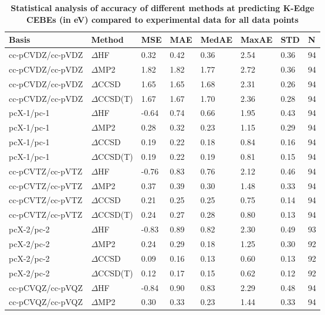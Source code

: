 \begin{table}
  \caption{\textbf{Statistical analysis of accuracy of different methods at predicting K-Edge CEBEs (in eV) compared to experimental data for all data points}}
  \begin{tabular}{l l l l l l l l }
    \toprule
    \textbf{Basis} & \textbf{Method} & \textbf{MSE} & \textbf{MAE} & \textbf{MedAE} & \textbf{MaxAE} & \textbf{STD} & \textbf{N} \\ 
    \midrule
    cc-pCVDZ/cc-pVDZ & $\Delta$HF & 0.32 & 0.42 & 0.36 & 2.54 & 0.36 & 94 \\ 
    cc-pCVDZ/cc-pVDZ & $\Delta$MP2 & 1.82 & 1.82 & 1.77 & 2.72 & 0.36 & 94 \\ 
    cc-pCVDZ/cc-pVDZ & $\Delta$CCSD & 1.65 & 1.65 & 1.68 & 2.31 & 0.26 & 94 \\ 
    cc-pCVDZ/cc-pVDZ & $\Delta$CCSD(T) & 1.67 & 1.67 & 1.70 & 2.36 & 0.28 & 94 \\ 
    pcX-1/pc-1 & $\Delta$HF & -0.64 & 0.74 & 0.66 & 1.95 & 0.43 & 94 \\ 
    pcX-1/pc-1 & $\Delta$MP2 & 0.28 & 0.32 & 0.23 & 1.15 & 0.29 & 94 \\ 
    pcX-1/pc-1 & $\Delta$CCSD & 0.19 & 0.22 & 0.18 & 0.84 & 0.16 & 94 \\ 
    pcX-1/pc-1 & $\Delta$CCSD(T) & 0.19 & 0.22 & 0.19 & 0.81 & 0.15 & 94 \\ 
    cc-pCVTZ/cc-pVTZ & $\Delta$HF & -0.76 & 0.83 & 0.76 & 2.12 & 0.46 & 94 \\ 
    cc-pCVTZ/cc-pVTZ & $\Delta$MP2 & 0.37 & 0.39 & 0.30 & 1.48 & 0.33 & 94 \\ 
    cc-pCVTZ/cc-pVTZ & $\Delta$CCSD & 0.21 & 0.25 & 0.25 & 0.75 & 0.14 & 94 \\ 
    cc-pCVTZ/cc-pVTZ & $\Delta$CCSD(T) & 0.24 & 0.27 & 0.28 & 0.80 & 0.13 & 94 \\ 
    pcX-2/pc-2 & $\Delta$HF & -0.83 & 0.89 & 0.82 & 2.30 & 0.49 & 93 \\ 
    pcX-2/pc-2 & $\Delta$MP2 & 0.24 & 0.29 & 0.18 & 1.25 & 0.30 & 92 \\ 
    pcX-2/pc-2 & $\Delta$CCSD & 0.09 & 0.16 & 0.13 & 0.60 & 0.13 & 92 \\ 
    pcX-2/pc-2 & $\Delta$CCSD(T) & 0.12 & 0.17 & 0.15 & 0.62 & 0.12 & 92 \\ 
    cc-pCVQZ/cc-pVQZ & $\Delta$HF & -0.84 & 0.90 & 0.83 & 2.29 & 0.48 & 94 \\ 
    cc-pCVQZ/cc-pVQZ & $\Delta$MP2 & 0.30 & 0.33 & 0.23 & 1.44 & 0.33 & 94 \\ 

\end{tabular}
\end{table}
